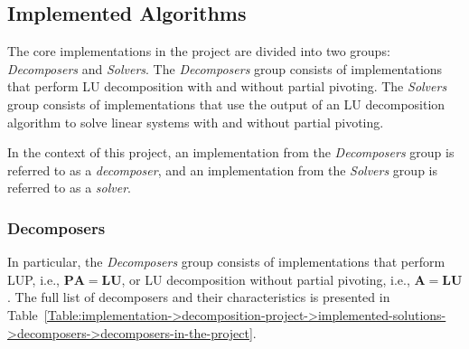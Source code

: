 \subsection{Implemented Algorithms}\label{Subsection:implementation->decomposition-project->implemented-algorithms}
The core implementations in the project are divided into two groups: \textit{Decomposers} and \textit{Solvers}. The \textit{Decomposers} group consists of implementations that perform LU decomposition with and without partial pivoting. The \textit{Solvers} group consists of implementations that use the output of an LU decomposition algorithm to solve linear systems with and without partial pivoting.

In the context of this project, an implementation from the \textit{Decomposers} group is referred to as a \textit{decomposer}, and an implementation from the \textit{Solvers} group is referred to as a \textit{solver}.

\subsubsection{Decomposers}\label{Subsection:implementation->decomposition-project->implemented-solutions->decomposers}
In particular, the \textit{Decomposers} group consists of implementations that perform LUP, i.e., $\mathbf{PA} = \mathbf{LU}$, or LU decomposition without partial pivoting, i.e., $\mathbf{A} = \mathbf{LU}$. The full list of decomposers and their characteristics is presented in Table~\ref{Table:implementation->decomposition-project->implemented-solutions->decomposers->decomposers-in-the-project}.

